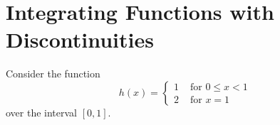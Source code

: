 \section{Integrating Functions with Discontinuities}

\begin{exercise} Consider the function
$$
h(x)= \begin{cases}1 & \text { for } 0 \leq x<1 \\ 2 & \text { for } x=1\end{cases}
$$
over the interval $[0,1]$.
\end{exercise}
\begin{solution}
    \TODO
\end{solution}

